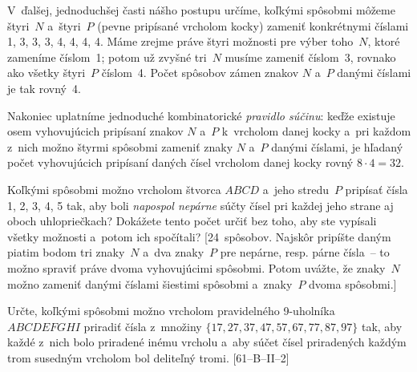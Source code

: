 {V~ďalšej, jednoduchšej časti nášho postupu určíme, koľkými spôsobmi
môžeme štyri~$N$ a~štyri~$P$ (pevne pripísané vrcholom kocky)
zameniť konkrétnymi číslami 1, 3, 3, 3, 4, 4, 4, 4. Máme zrejme
práve štyri možnosti pre výber toho~$N$, ktoré zameníme číslom~1;
potom už zvyšné tri~$N$ musíme zameniť číslom~3, rovnako ako
všetky štyri~$P$ číslom~4. Počet spôsobov zámen znakov $N$ a~$P$
danými číslami je tak rovný~4.

Nakoniec uplatníme jednoduché kombinatorické {\it pravidlo
súčinu\/}: keďže existuje osem
vyhovujúcich pripísaní znakov $N$ a~$P$ k~vrcholom danej kocky
a~pri každom z~nich možno štyrmi spôsobmi zameniť znaky $N$ a~$P$ danými
číslami, je hľadaný počet vyhovujúcich pripísaní daných čísel
vrcholom danej kocky rovný $8\cdot4=32$.



Koľkými spôsobmi možno vrcholom štvorca $ABCD$ a~jeho stredu~$P$
pripísať čísla 1, 2, 3, 4, 5 tak, aby boli {\it napospol nepárne\/}
súčty čísel pri každej jeho strane aj oboch uhlopriečkach? Dokážete tento počet
určiť bez toho, aby ste vypísali všetky možnosti a~potom ich spočítali?
[24~spôsobov. Najskôr pripíšte daným piatim bodom tri znaky~$N$ a~dva znaky~$P$
pre nepárne, resp. párne čísla~-- to možno spraviť práve dvoma
vyhovujúcimi spôsobmi. Potom
uvážte, že znaky~$N$ možno zameniť danými číslami šiestimi spôsobmi
a~znaky~$P$ dvoma spôsobmi.]

\D
Určte, koľkými spôsobmi možno vrcholom pravidelného 9-uholníka $ABCDEFGHI$
priradiť čísla z~množiny $\{17,27,37,47,57,67,77,87,97\}$ tak, aby každé z~nich bolo
priradené inému vrcholu a~aby súčet čísel priradených každým trom susedným vrcholom bol
deliteľný tromi. [61--B--II--2]
}

